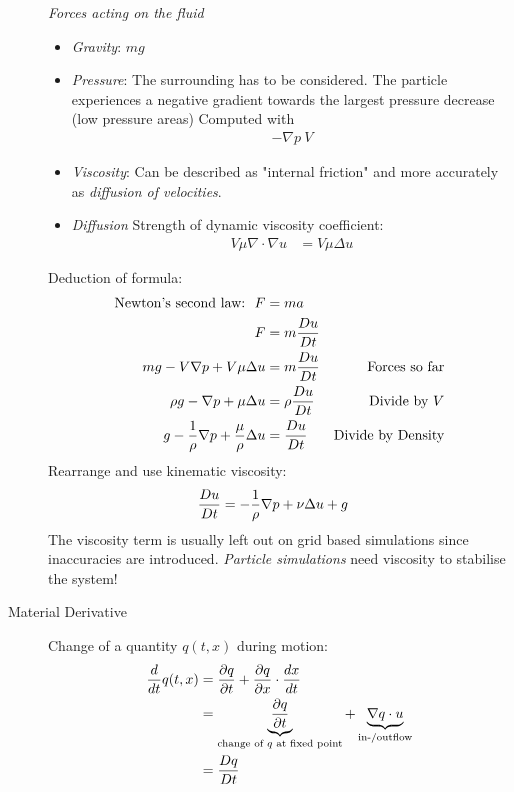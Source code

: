 \begin{multicols}{2}
\begin{description}
		\emph{Forces acting on the fluid}
		\begin{itemize}
			\item \emph{Gravity}: $mg$
			\item \emph{Pressure}: The surrounding has to be considered. The particle experiences a negative gradient towards the largest pressure decrease (low pressure areas)
			Computed with 
			\begin{align*}
				-\nabla p\ V
			\end{align*}
			\item \emph{Viscosity}: Can be described as "internal friction" and more accurately as \emph{diffusion of velocities}.
			\item \emph{Diffusion} Strength of dynamic viscosity coefficient:
				\begin{align*}
					V \mu \nabla \cdot \nabla u &= V \mu \Delta u
				\end{align*}
		\end{itemize}
		Deduction of formula:
		\begin{align*}
			\text{Newton's second law:} \ \ F &= ma\\
			F &= m {Du \over Dt}\\
			mg - V\nabla p +  V\mu\Delta u &= m{Du \over Dt} &\text{Forces so far}\\
			\rho g - \nabla p + \mu \Delta u &= \rho {Du\over Dt}& \text{Divide by $V$}\\
			g - {1 \over \rho} \nabla p + {\mu \over \rho} \Delta u &= {Du \over Dt} &\text{Divide by Density}
		\end{align*}
		Rearrange and use kinematic viscosity:
		\begin{align*}
			{Du \over Dt} &= - {1\over \rho} \nabla p + \nu \Delta u + g
		\end{align*}
		The viscosity term is usually left out on grid based simulations since inaccuracies are introduced. \emph{Particle simulations} need viscosity to stabilise the system!
	\item[Material Derivative] Change of a quantity $q(t,x)$ during motion:
		\begin{align*}
			{d\over dt} q(t, x) &= {\partial q\over \partial t} + {\partial q \over \partial x} \cdot {d x\over dt}\\
			&= \underbrace{{\partial q \over  \partial t}}_\text{change of $q$ at fixed point} + \underbrace{\nabla q \cdot u}_\text{in-/outflow}\\
			&= {Dq \over  Dt}
		\end{align*}

\end{description}
\end{multicols}
